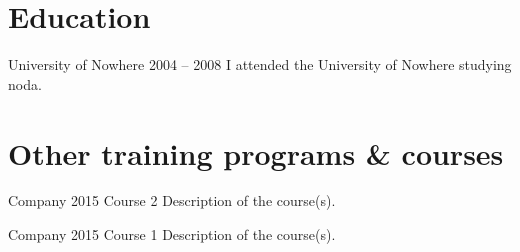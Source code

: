 \documentclass{sobCV}[2015/09/08]
\begin{document}
   \section{Education}
   \ednode
      {University of Nowhere}                        %
      {2004 -- 2008}{                                %
      I attended the University of Nowhere studying noda.
   }


   \section{Other training programs \& courses}
   \coursenode
      {Company}                                          %
      {2015}                                             %
      {Course 2}{                                        %
      Description of the course(s).
   }

   \coursenode
      {Company}                                          %
      {2015}                                             %
      {Course 1}{                                        %
      Description of the course(s).
   }

\end{document}
